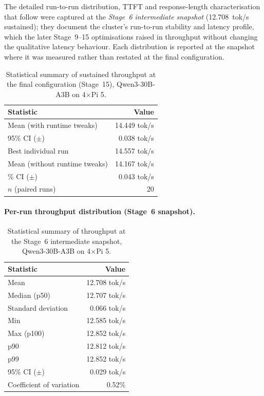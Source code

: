 \documentclass[10pt,a4paper]{article}
\begin{document}
The detailed run-to-run distribution, TTFT and response-length characterisation that follow were captured at the \emph{Stage~6 intermediate snapshot} (12.708~tok/s sustained); they document the cluster's run-to-run stability and latency profile, which the later Stage~9--15 optimisations raised in throughput without changing the qualitative latency behaviour. Each distribution is reported at the snapshot where it was measured rather than restated at the final configuration.

\begin{table}[H]
\centering
\caption{Statistical summary of sustained throughput at the final configuration (Stage~15), Qwen3-30B-A3B on 4$\times$Pi 5.}
\label{tab:final-config}
\begin{tabular}{lr}
\toprule
\textbf{Statistic} & \textbf{Value} \\
\midrule
Mean (with runtime tweaks)    & 14.449 tok/s \\
95\% CI ($\pm$)               & 0.038 tok/s \\
Best individual run           & 14.557 tok/s \\
Mean (without runtime tweaks) & 14.167 tok/s \\
\quad 95\% CI ($\pm$)         & 0.043 tok/s \\
$n$ (paired runs)             & 20 \\
\bottomrule
\end{tabular}
\end{table}

\paragraph{Per-run throughput distribution (Stage~6 snapshot).}

\begin{table}[H]
\centering
\caption{Statistical summary of throughput at the Stage~6 intermediate snapshot, Qwen3-30B-A3B on 4$\times$Pi 5.}
\begin{tabular}{lr}
\toprule
\textbf{Statistic} & \textbf{Value} \\
\midrule
Mean             & 12.708 tok/s \\
Median (p50)     & 12.707 tok/s \\
Standard deviation & 0.066 tok/s \\
Min              & 12.585 tok/s \\
Max (p100)       & 12.852 tok/s \\
p90              & 12.812 tok/s \\
p99              & 12.852 tok/s \\
95\% CI ($\pm$)  & 0.029 tok/s \\
Coefficient of variation & 0.52\% \\
\bottomrule
\end{tabular}
\end{table}
\end{document}
